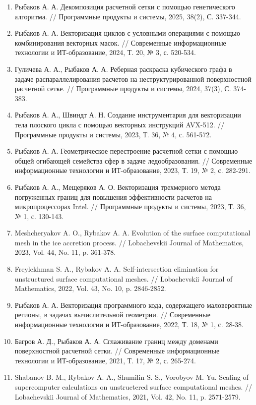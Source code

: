 \documentclass[a4paper,14pt]{extarticle}                     %
\theoremstyle{plain}                                         %
\begin{document}
\begin{enumerate}
\item Рыбаков А. А. Декомпозиция расчетной сетки с помощью генетического алгоритма. // Программные продукты и системы, 2025, 38(2), С. 337-344.
\item Рыбаков А. А. Векторизация циклов с условными операциями с помощью комбинирования векторных масок. // Современные информационные технологии и ИТ-образование, 2024, Т. 20, № 3, с. 520-534.
\item Гуличева А. А., Рыбаков А. А. Реберная раскраска кубического графа в задаче распараллелирования расчетов на неструктурированной поверхностной расчетной сетке. // Программные продукты и системы, 2024, 37(3), С. 374-383.
\item Рыбаков А. А., Швиндт А. Н. Создание инструментария для векторизации тела плоского цикла с помощью векторных инструкций AVX-512. // Программные продукты и системы, 2023, Т. 36, № 4, с. 561-572.
\item Рыбаков А. А. Геометрическое перестроение расчетной сетки с помощью общей огибающей семейства сфер в задаче ледообразования. // Современные информационные технологии и ИТ-образование, 2023, Т. 19, № 2, с. 282-291.
\item Рыбаков А. А., Мещеряков А. О. Векторизация трехмерного метода погруженных границ для повышения эффективности расчетов на микропроцессорах Intel. // Программные продукты и системы, 2023, Т. 36, № 1, с. 130-143.
\item Meshcheryakov A. O., Rybakov A. A. Evolution of the surface computational mesh in the ice accretion process. // Lobachevskii Journal of Mathematics, 2023, Vol. 44, No. 11, p. 361-378.
\item Freylekhman S. A., Rybakov A. A. Self-intersection elimination for unstructured surface computational meshes. // Lobachevskii Journal of Mathematics, 2022, Vol. 43, No. 10, p. 2846-2852.
\item Рыбаков А. А. Векторизация программного кода, содержащего маловероятные регионы, в задачах вычислительной геометрии. // Современные информационные технологии и ИТ-образование, 2022, Т. 18, № 1, с. 28-38.
\item Багров А. Д., Рыбаков А. А. Сглаживание границ между доменами поверхностной расчетной сетки. // Современные информационные технологии и ИТ-образование, 2021, Т. 17, № 2, с. 265-274.
\item Shabanov B. M., Rybakov A. A., Shumilin S. S., Vorobyov M. Yu. Scaling of supercomputer calculations on unstructered surface computational meshes. // Lobachevskii Journal of Mathematics, 2021, Vol. 42, No. 11, p. 2571-2579.

\end{enumerate}
\end{document}
